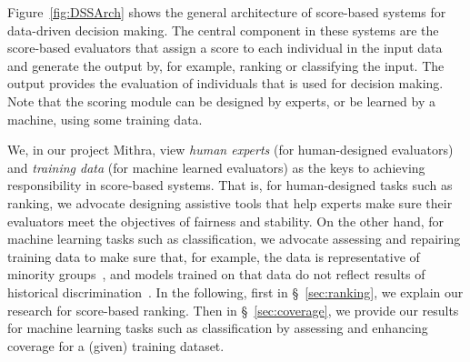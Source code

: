 Figure~\ref{fig:DSSArch} shows the general architecture of score-based systems for data-driven decision making.
The central component in these systems are the score-based evaluators that assign a score to each individual in the input data and generate the output by, for example, ranking or classifying the input. The output provides the evaluation of individuals that is used for decision making. %
Note that 
the scoring module can be designed by experts, or be learned by a machine, using some training data.

We, in our project Mithra, view \textit{human experts} (for human-designed evaluators) and \textit{training data} (for machine learned evaluators) as the keys to achieving responsibility in score-based systems.
That is, for human-designed tasks such as ranking, we advocate designing assistive tools that help experts make sure their evaluators meet the objectives of fairness and stability. On the other hand, for machine learning tasks such as classification, we advocate assessing and repairing training data to make sure that, for example,  the data is representative of minority groups~\cite{asudeh2019designing}, and models trained on that data do not reflect results of historical discrimination~\cite{salimi2019capuchin}.
In the following, first in \S~\ref{sec:ranking}, we explain our research for score-based ranking. Then in \S~\ref{sec:coverage}, we provide our results for machine learning tasks such as classification by assessing and enhancing coverage for a (given) training dataset.





